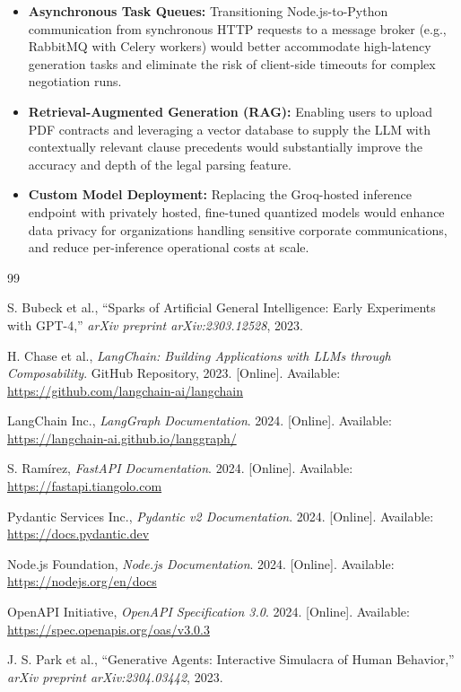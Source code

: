 \documentclass[12pt,a4paper]{report}
\begin{document}
\begin{itemize}
	\item \textbf{Asynchronous Task Queues:} Transitioning Node.js-to-Python communication from synchronous HTTP requests to a message broker (e.g., RabbitMQ with Celery workers) would better accommodate high-latency generation tasks and eliminate the risk of client-side timeouts for complex negotiation runs.
	\item \textbf{Retrieval-Augmented Generation (RAG):} Enabling users to upload PDF contracts and leveraging a vector database to supply the LLM with contextually relevant clause precedents would substantially improve the accuracy and depth of the legal parsing feature.
	\item \textbf{Custom Model Deployment:} Replacing the Groq-hosted inference endpoint with privately hosted, fine-tuned quantized models would enhance data privacy for organizations handling sensitive corporate communications, and reduce per-inference operational costs at scale.
\end{itemize}

\clearpage
{}
\begin{thebibliography}{99}

	S. Bubeck et al., ``Sparks of Artificial General Intelligence: Early Experiments with GPT-4,'' \textit{arXiv preprint arXiv:2303.12528}, 2023.

	H. Chase et al., \textit{LangChain: Building Applications with LLMs through Composability}. GitHub Repository, 2023. [Online]. Available: \url{https://github.com/langchain-ai/langchain}

	LangChain Inc., \textit{LangGraph Documentation}. 2024. [Online]. Available: \url{https://langchain-ai.github.io/langgraph/}

	S. Ram\'irez, \textit{FastAPI Documentation}. 2024. [Online]. Available: \url{https://fastapi.tiangolo.com}

	Pydantic Services Inc., \textit{Pydantic v2 Documentation}. 2024. [Online]. Available: \url{https://docs.pydantic.dev}

	Node.js Foundation, \textit{Node.js Documentation}. 2024. [Online]. Available: \url{https://nodejs.org/en/docs}

	OpenAPI Initiative, \textit{OpenAPI Specification 3.0}. 2024. [Online]. Available: \url{https://spec.openapis.org/oas/v3.0.3}

	J. S. Park et al., ``Generative Agents: Interactive Simulacra of Human Behavior,'' \textit{arXiv preprint arXiv:2304.03442}, 2023.

\end{thebibliography}
\end{document}
